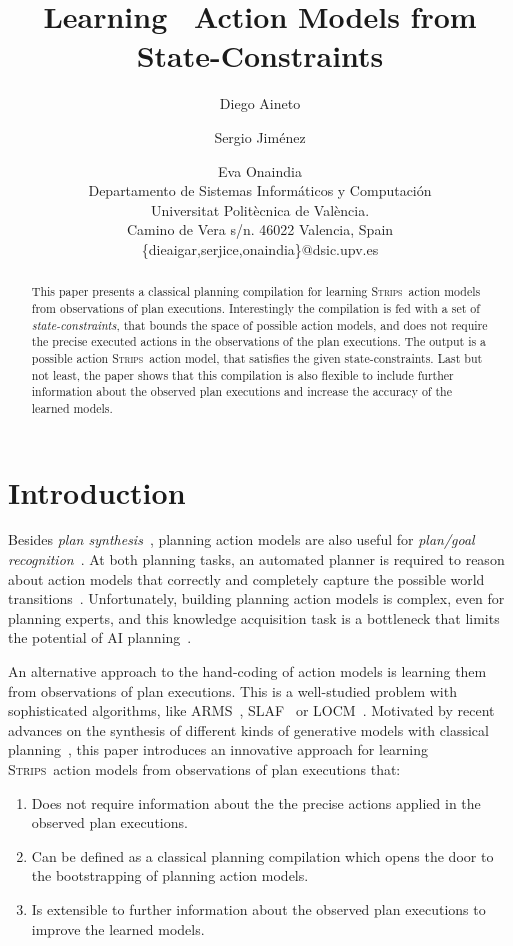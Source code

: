 \documentclass{article}
\title{Learning \strips\ Action Models from State-Constraints}
\author{Diego Aineto\and Sergio Jim\'enez\and Eva Onaindia\\
{\small Departamento de Sistemas Inform\'aticos y Computaci\'on}\\
{\small Universitat Polit\`ecnica de Val\`encia.}\\
{\small Camino de Vera s/n. 46022 Valencia, Spain}\\
{\small \{dieaigar,serjice,onaindia\}@dsic.upv.es}}
\newcommand{\strips}{\textsc{Strips}}     %
\begin{document}
\maketitle

\begin{abstract}
This paper presents a classical planning compilation for learning \strips\ action models from observations of plan executions. Interestingly the compilation is fed with a set of {\em state-constraints}, that bounds the space of possible action models, and does not require the precise executed actions in the observations of the plan executions. The output is a possible action \strips\ action model, that satisfies the given state-constraints. Last but not least, the paper shows that this compilation is also flexible to include further information about the observed plan executions and increase the accuracy of the learned models.  
\end{abstract}

\section{Introduction}
Besides {\em plan synthesis}~\cite{ghallab2004automated}, planning action models are also useful for {\em plan/goal recognition}~\cite{ramirez2012plan}. At both planning tasks, an automated planner is required to reason about action models that correctly and completely capture the possible world transitions~\cite{geffner:book:2013}. Unfortunately, building planning action models is complex, even for planning experts, and this knowledge acquisition task is a bottleneck that limits the potential of AI planning~\cite{kambhampati:modellite:AAAI2007}.

An alternative approach to the hand-coding of action models is learning them from observations of plan executions. This is a well-studied problem with sophisticated algorithms, like {\sc ARMS}~\cite{yang2007learning}, {\sc SLAF}~\cite{amir:alearning:JAIR08} or {\sc LOCM}~\cite{cresswell2013acquiring}. Motivated by recent advances on the synthesis of different kinds of generative models with classical planning~\cite{bonet2009automatic,segovia2016hierarchical,segovia2017generating}, this paper introduces an innovative approach for learning \strips\ action models from observations of plan executions that:
\begin{enumerate}
\item Does not require information about the the precise actions applied in the observed plan executions.
\item Can be defined as a classical planning compilation which opens the door to the bootstrapping of planning action models.
\item Is extensible to further information about the observed plan executions to improve the learned models.
\end{enumerate}
\end{document}
